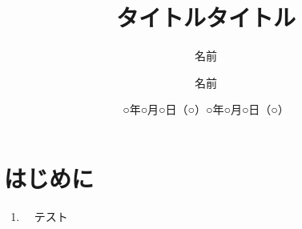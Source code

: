 \tableofcontents

\section{はじめに}

\begin{enumerate}
  \item　テスト
\end{enumerate}



\documentclass{jsarticle}
\usepackage[dvipdfmx]{graphicx}
\setlength{\textheight}{24cm}
\setlength{\topmargin}{-1.5cm}
\setlength{\textwidth}{17cm}
\setlength{\oddsidemargin}{-.5cm}
\usepackage{here}


\title{タイトル}
\author{名前} %
\date{○年○月○日（○）} %


\maketitle

\tableofcontents

\section{はじめに}

\begin{enumerate}
  \item　テスト
\end{enumerate}



\documentclass{jsarticle}
\usepackage[dvipdfmx]{graphicx}
\setlength{\textheight}{24cm}
\setlength{\topmargin}{-1.5cm}
\setlength{\textwidth}{17cm}
\setlength{\oddsidemargin}{-.5cm}
\usepackage{here}


\title{タイトル}
\author{名前} %
\date{○年○月○日（○）} %


\maketitle

\tableofcontents

\section{はじめに}

\begin{enumerate}
  \item　テスト
\end{enumerate}



